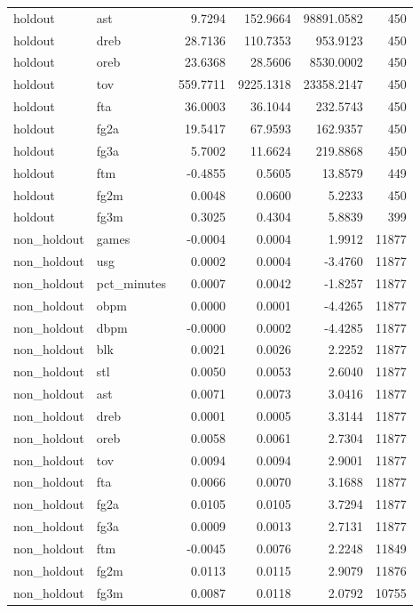 \begin{table}
\begin{tabular}{llrrrr}
holdout & ast & 9.7294 & 152.9664 & 98891.0582 & 450 \\
holdout & dreb & 28.7136 & 110.7353 & 953.9123 & 450 \\
holdout & oreb & 23.6368 & 28.5606 & 8530.0002 & 450 \\
holdout & tov & 559.7711 & 9225.1318 & 23358.2147 & 450 \\
holdout & fta & 36.0003 & 36.1044 & 232.5743 & 450 \\
holdout & fg2a & 19.5417 & 67.9593 & 162.9357 & 450 \\
holdout & fg3a & 5.7002 & 11.6624 & 219.8868 & 450 \\
holdout & ftm & -0.4855 & 0.5605 & 13.8579 & 449 \\
holdout & fg2m & 0.0048 & 0.0600 & 5.2233 & 450 \\
holdout & fg3m & 0.3025 & 0.4304 & 5.8839 & 399 \\
non\_holdout & games & -0.0004 & 0.0004 & 1.9912 & 11877 \\
non\_holdout & usg & 0.0002 & 0.0004 & -3.4760 & 11877 \\
non\_holdout & pct\_minutes & 0.0007 & 0.0042 & -1.8257 & 11877 \\
non\_holdout & obpm & 0.0000 & 0.0001 & -4.4265 & 11877 \\
non\_holdout & dbpm & -0.0000 & 0.0002 & -4.4285 & 11877 \\
non\_holdout & blk & 0.0021 & 0.0026 & 2.2252 & 11877 \\
non\_holdout & stl & 0.0050 & 0.0053 & 2.6040 & 11877 \\
non\_holdout & ast & 0.0071 & 0.0073 & 3.0416 & 11877 \\
non\_holdout & dreb & 0.0001 & 0.0005 & 3.3144 & 11877 \\
non\_holdout & oreb & 0.0058 & 0.0061 & 2.7304 & 11877 \\
non\_holdout & tov & 0.0094 & 0.0094 & 2.9001 & 11877 \\
non\_holdout & fta & 0.0066 & 0.0070 & 3.1688 & 11877 \\
non\_holdout & fg2a & 0.0105 & 0.0105 & 3.7294 & 11877 \\
non\_holdout & fg3a & 0.0009 & 0.0013 & 2.7131 & 11877 \\
non\_holdout & ftm & -0.0045 & 0.0076 & 2.2248 & 11849 \\
non\_holdout & fg2m & 0.0113 & 0.0115 & 2.9079 & 11876 \\
non\_holdout & fg3m & 0.0087 & 0.0118 & 2.0792 & 10755 \\
\bottomrule
\end{tabular}
\end{table}
